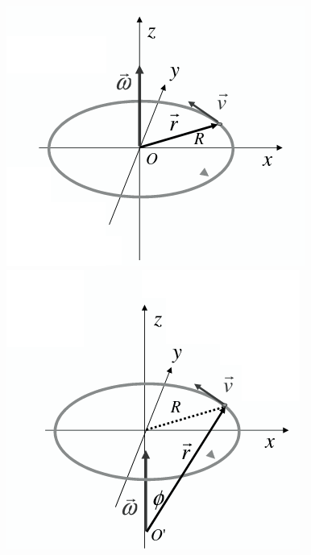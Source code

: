 \documentclass[a4paper,12pt, oneside]{book}
\begin{document}
\begin{center}
	\includegraphics[scale=0.5]{img/cir5.png}
	\quad
	\includegraphics[scale=0.5]{img/cir6.png}
\end{center}
\end{document}
